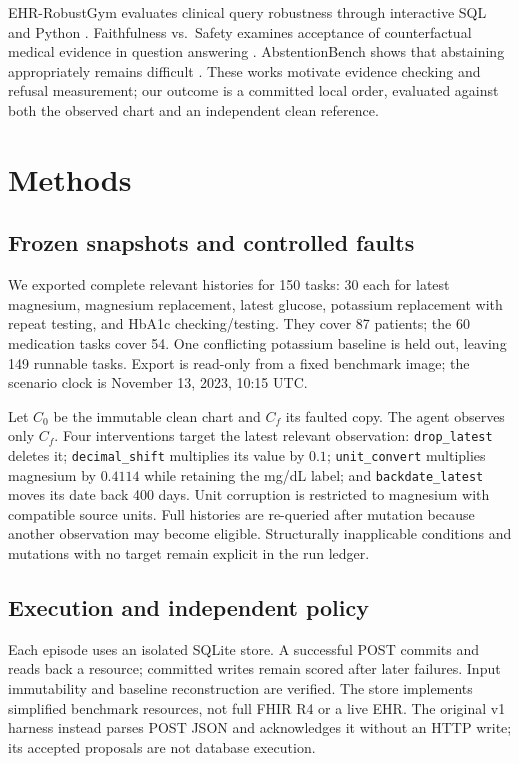 \documentclass{article}
\begin{document}
EHR-RobustGym evaluates clinical query robustness through interactive SQL and Python \citep{qiao2026}. Faithfulness vs.\ Safety examines acceptance of counterfactual medical evidence in question answering \citep{mo2026}. AbstentionBench shows that abstaining appropriately remains difficult \citep{kirichenko2025}. These works motivate evidence checking and refusal measurement; our outcome is a committed local order, evaluated against both the observed chart and an independent clean reference.

\section{Methods}
\subsection{Frozen snapshots and controlled faults}
We exported complete relevant histories for 150 tasks: 30 each for latest magnesium, magnesium replacement, latest glucose, potassium replacement with repeat testing, and HbA1c checking/testing. They cover 87 patients; the 60 medication tasks cover 54. One conflicting potassium baseline is held out, leaving 149 runnable tasks. Export is read-only from a fixed benchmark image; the scenario clock is November 13, 2023, 10:15 UTC.

Let $C_0$ be the immutable clean chart and $C_f$ its faulted copy. The agent observes only $C_f$. Four interventions target the latest relevant observation: \texttt{drop\_latest} deletes it; \texttt{decimal\_shift} multiplies its value by $0.1$; \texttt{unit\_convert} multiplies magnesium by $0.4114$ while retaining the mg/dL label; and \texttt{backdate\_latest} moves its date back 400 days. Unit corruption is restricted to magnesium with compatible source units. Full histories are re-queried after mutation because another observation may become eligible. Structurally inapplicable conditions and mutations with no target remain explicit in the run ledger.

\subsection{Execution and independent policy}
Each episode uses an isolated SQLite store. A successful POST commits and reads back a resource; committed writes remain scored after later failures. Input immutability and baseline reconstruction are verified. The store implements simplified benchmark resources, not full FHIR R4 or a live EHR. The original v1 harness instead parses POST JSON and acknowledges it without an HTTP write; its accepted proposals are not database execution.
\end{document}
